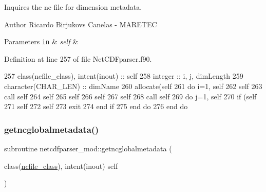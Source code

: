 Inquires the nc file for dimension metadata. 

\begin{DoxyAuthor}{Author}
Ricardo Birjukovs Canelas -\/ M\+A\+R\+E\+T\+EC 
\end{DoxyAuthor}

\begin{DoxyParams}[1]{Parameters}
\mbox{\tt in}  & {\em self} & \\
\hline
\end{DoxyParams}


Definition at line 257 of file Net\+C\+D\+Fparser.\+f90.


\begin{DoxyCode}
257     \textcolor{keywordtype}{class}(ncfile\_class), \textcolor{keywordtype}{intent(inout)} :: self
258     \textcolor{keywordtype}{integer} :: i, j, dimLength
259     \textcolor{keywordtype}{character(CHAR\_LEN)} :: dimName
260     \textcolor{keyword}{allocate}(self%
261     \textcolor{keywordflow}{do} i=1, self%
262         self%
263         \textcolor{keyword}{call }self%
264         self%
265         self%
266         self%
267         self%
268         \textcolor{keyword}{call }self%
269         \textcolor{keywordflow}{do} j=1, self%
270             \textcolor{keywordflow}{if} (self%
271                 self%
272                 self%
273                 \textcolor{keywordflow}{exit}
274 \textcolor{keywordflow}{            end if}
275 \textcolor{keywordflow}{        end do}
276 \textcolor{keywordflow}{    end do}
\end{DoxyCode}
\mbox{\label{namespacenetcdfparser__mod_a409f59662d71fb63e5fb5e057fdfd6ee}} 
\subsubsection{\texorpdfstring{getncglobalmetadata()}{getncglobalmetadata()}}
{\footnotesize\ttfamily subroutine netcdfparser\+\_\+mod\+::getncglobalmetadata (\begin{DoxyParamCaption}\item[{class(\mbox{\hyperlink{structnetcdfparser__mod_1_1ncfile__class}{ncfile\+\_\+class}}), intent(inout)}]{self }\end{DoxyParamCaption})\hspace{0.3cm}{\ttfamily [private]}}



